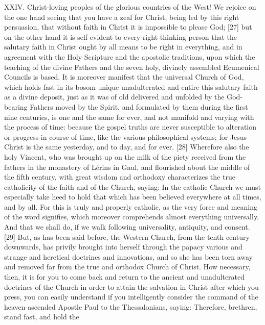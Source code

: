 XXIV. Christ-loving peoples of the glorious countries of the West! We
rejoice on the one hand seeing that you have a zeal for Christ, being
led by this right persuasion, \textquotesingle that without faith in
Christ it is impossible to please God\textquotesingle; {[}27{]} but on
the other hand it is self-evident to every right-thinking person that
the salutary faith in Christ ought by all means to be right in
everything, and in agreement with the Holy Scripture and the apostolic
traditions, upon which the teaching of the divine Fathers and the seven
holy, divinely assembled Ecumenical Councils is based. It is moreover
manifest that the universal Church of God, which holds fast in its bosom
unique unadulterated and entire this salutary faith as a divine deposit,
just as it was of old delivered and unfolded by the God-bearing Fathers
moved by the Spirit, and formulated by them during the first nine
centuries, is one and the same for ever, and not manifold and varying
with the process of time: because the gospel truths are never
susceptible to alteration or progress in course of time, like the
various philosophical systems; \textquotesingle for Jesus Christ is the
same yesterday, and to day, and for ever.\textquotesingle{} {[}28{]}
Wherefore also the holy Vincent, who was brought up on the milk of the
piety received from the fathers in the monastery of Lérins in Gaul, and
flourished about the middle of the fifth century, with great wisdom and
orthodoxy characterizes the true catholicity of the faith and of the
Church, saying: \textquotesingle In the catholic Church we must
especially take heed to hold that which has been believed everywhere at
all times, and by all. For this is truly and properly catholic, as the
very force and meaning of the word signifies, which moreover comprehends
almost everything universally. And that we shall do, if we walk
following universality, antiquity, and consent.\textquotesingle{}
{[}29{]} But, as has been said before, the Western Church, from the
tenth century downwards, has privily brought into herself through the
papacy various and strange and heretical doctrines and innovations, and
so she has been torn away and removed far from the true and orthodox
Church of Christ. How necessary, then, it is for you to come back and
return to the ancient and unadulterated doctrines of the Church in order
to attain the salvation in Christ after which you press, you can easily
understand if you intelligently consider the command of the
heaven-ascended Apostle Paul to the Thessalonians, saying:
\textquotesingle Therefore, brethren, stand fast, and hold the
